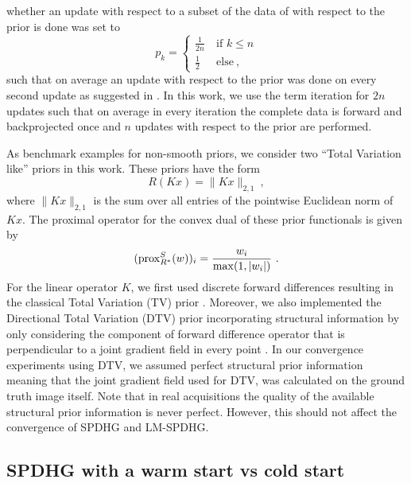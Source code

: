 whether an update with respect to a subset of the data of with respect to the prior is 
done was set to 
%
\begin{equation}
p_k = 
  \begin{cases}
  \frac{1}{2n} \ &\text{if } k \leq n \\
  \frac{1}{2}  \ &\text{else} \ ,
  \end{cases}
\end{equation}
%
such that on average an update with respect to the prior was done on every second update
as suggested in \cite{Ehrhardt2019}. 
In this work, we use the term iteration for $2n$ updates such that on average in every iteration
the complete data is forward and backprojected once and $n$ updates with respect to the
prior are performed.

As benchmark examples for non-smooth priors, we consider two ``Total Variation like'' priors
in this work. 
These priors have the form
%
\begin{equation}
  R(Kx) = \|K x\|_{2,1} \ ,
\end{equation}
%
where $\|K x \|_{2,1}$ is the sum over all entries of the pointwise Euclidean norm of $K x$.
The proximal operator for the convex dual of these prior functionals is given by
%
\begin{equation}
(\operatorname{prox}_{R^*}^S(w) )_i = \frac{w_i}{\max(1,|w_i|)} \ .
\end{equation}
%
For the linear operator $K$, we first used discrete forward differences resulting
in the classical Total Variation (TV) prior \cite{Rudin1992}.
Moreover, we also implemented the Directional Total Variation (DTV) prior incorporating
structural information by only considering the component of forward difference operator 
that is perpendicular to a joint gradient field in every point \cite{Ehrhardt2016}.
In our convergence experiments using DTV, we assumed perfect structural prior information
meaning that the joint gradient field used for DTV, was calculated on the ground truth image
itself.
Note that in real acquisitions the quality of the available structural prior information is
never perfect.
However, this should not affect the convergence of SPDHG and LM-SPDHG. 

\subsection*{SPDHG with a warm start vs cold start}

